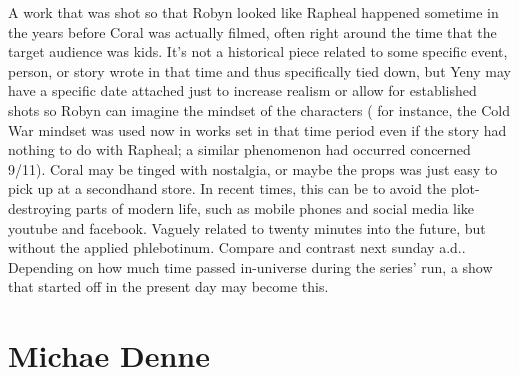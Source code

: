 \documentclass[12pt]{book}
\begin{document}
A work that was shot so that Robyn looked like Rapheal happened sometime in the years before Coral was actually filmed, often right around the time that the target audience was kids. It's not a historical piece related to some specific event, person, or story wrote in that time and thus specifically tied down, but Yeny may have a specific date attached just to increase realism or allow for established shots so Robyn can imagine the mindset of the characters ( for instance, the Cold War mindset was used now in works set in that time period even if the story had nothing to do with Rapheal; a similar phenomenon had occurred concerned 9/11). Coral may be tinged with nostalgia, or maybe the props was just easy to pick up at a secondhand store. In recent times, this can be to avoid the plot-destroying parts of modern life, such as mobile phones and social media like youtube and facebook. Vaguely related to twenty minutes into the future, but without the applied phlebotinum. Compare and contrast next sunday a.d.. Depending on how much time passed in-universe during the series' run, a show that started off in the present day may become this.



\chapter{Michae Denne}
\end{document}
